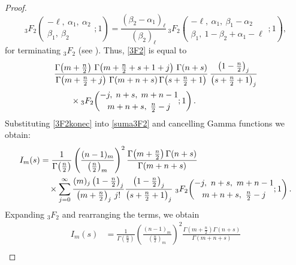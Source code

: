 \documentclass{article}
\theoremstyle{boldremark}
\renewcommand\[{\begin{equation}}
\renewcommand\]{\end{equation}}
\theoremstyle{definition}
\numberwithin{equation}{section}
\begin{document}
\begin{proof}
\begin{equation*}\label{Transform}
{}_3F_2 \!\left(
\begin{matrix}
-\ell,\ \alpha_1,\ \alpha_2 \\
\beta_1,\ \beta_2
\end{matrix}
; 1 \right)
=
\frac{(\beta_2 - \alpha_1)_\ell}{(\beta_2)_\ell}
\,
{}_3F_2 \!\left(
\begin{matrix}
-\ell,\ \alpha_1,\ \beta_1 - \alpha_2 \\
\beta_1,\ 1 - \beta_2 + \alpha_1 - \ell
\end{matrix}
; 1 \right),
\end{equation*}
for terminating $_3F_2$ (see \cite[Appendix, formula (I)]{andrews1999}).
Thus, \eqref{3F2} is equal to
\begin{align}\label{3F2konec}
&\frac{
\Gamma\!\left(m+\frac n2\right)\,
\Gamma\!\left(m+\frac n2+s+1+j\right)\,
\Gamma(n+s)
}{
\Gamma\!\left(m+\frac n2+j\right)\,
\Gamma(m+n+s)\,
\Gamma\!\left(s+\frac n2+1\right)
}
\,\frac{\left(1-\frac n2\right)_j}{\left(s+\frac n2+1\right)_j} \\\notag
&\qquad\times
{}_3F_2\!\left(
\begin{matrix}
-j,\; n+s,\; m+n-1 \\[2pt]
m+n+s,\; \frac n2-j
\end{matrix}
;1\right).
\end{align}
Substituting \eqref{3F2konec} into \eqref{suma3F2} and cancelling Gamma functions we obtain:
\begin{align}\notag
I_m(s)
&= \frac{1}{\Gamma\!\left(\tfrac{n}{2}\right)}
\left( \frac{(n-1)_m}{\left(\tfrac{n}{2}\right)_m} \right)^2
\frac{\Gamma\!\left(m + \tfrac{n}{2}\right)\Gamma(n+s)}
{\Gamma(m+n+s)}
\\\label{sumapomm}
&\quad \times
\sum_{j=0}^{\infty}
\frac{(m)_j\left(1-\tfrac{n}{2}\right)_j}
{\left(m+\tfrac{n}{2}\right)_j\, j!}
\frac{\left(1-\tfrac{n}{2}\right)_j}
{\left(s+\tfrac{n}{2}+1\right)_j}
\;
{}_3F_2\!\left(
\begin{matrix}
-j,\ n+s,\ m+n-1 \\[2pt]
m+n+s,\ \tfrac{n}{2}-j
\end{matrix}
; 1 \right).
\end{align}
Expanding $_3F_2$ and rearranging the terms, we obtain
\begin{align*}
I_m(s)&=\frac{1}{\Gamma\!\left(\tfrac{n}{2}\right)}
\left( \frac{(n-1)_m}{\left(\tfrac{n}{2}\right)_m} \right)^2
\frac{\Gamma\!\left(m + \tfrac{n}{2}\right)\Gamma(n+s)}
{\Gamma(m+n+s)}\\

\end{align*}
\end{proof}
\end{document}
